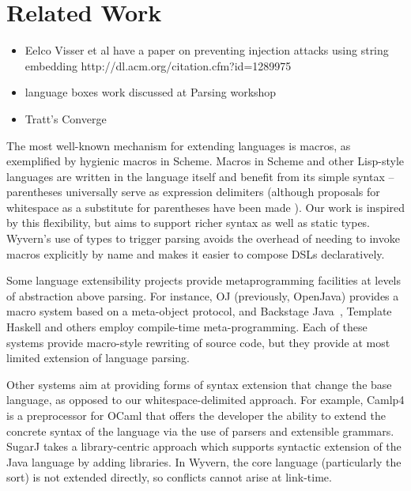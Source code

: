 \section{Related Work}
\label{s:related}

\begin{itemize}
\item Eelco Visser et al have a paper on preventing injection attacks using string embedding http://dl.acm.org/citation.cfm?id=1289975~\cite{Bravenboer:2007:PIA:1289971.1289975}
\item language boxes work discussed at Parsing workshop~\cite{Diekmann:2013}
\item Tratt's Converge~\cite{Tratt:2005:CMD:1146841.1146846}
\end{itemize}

The most well-known mechanism for extending languages is macros, as exemplified by hygienic macros in Scheme. Macros in Scheme and other Lisp-style languages are written in the language itself and benefit from its simple syntax -- parentheses universally serve as expression delimiters (although proposals for whitespace as a substitute for parentheses have been made \cite{srfi-49}). Our work is inspired by this flexibility, but aims to support richer syntax as well as static types. Wyvern's use of types to trigger parsing  avoids the overhead of needing to invoke macros explicitly by name and makes it easier to compose DSLs declaratively.


Some language extensibility projects provide metaprogramming facilities at levels of abstraction above parsing. For instance, OJ (previously, OpenJava)
\cite{Tatsubori00openjava:a} provides a macro system based on a meta-object
protocol, and Backstage Java~\cite{Palmer:2011:BJM:2048066.2048137}, Template Haskell \cite{sheard2002template} and others employ compile-time meta-programming.  Each of these systems provide macro-style rewriting of source code, but they provide at most limited extension of language parsing.

Other systems aim at providing forms of syntax extension that change the base language, as opposed to our whitespace-delimited approach.  For example, Camlp4 \cite{camlp4} is a preprocessor for OCaml that offers the developer the ability to extend the concrete syntax of the language via the use of parsers and extensible grammars.  SugarJ \cite{Erdweg:2011:SLL:2048147.2048199} takes a library-centric approach which supports syntactic extension of the Java language by adding libraries. In Wyvern, the core language (particularly the  sort) is not extended directly, so conflicts cannot arise at link-time. 

